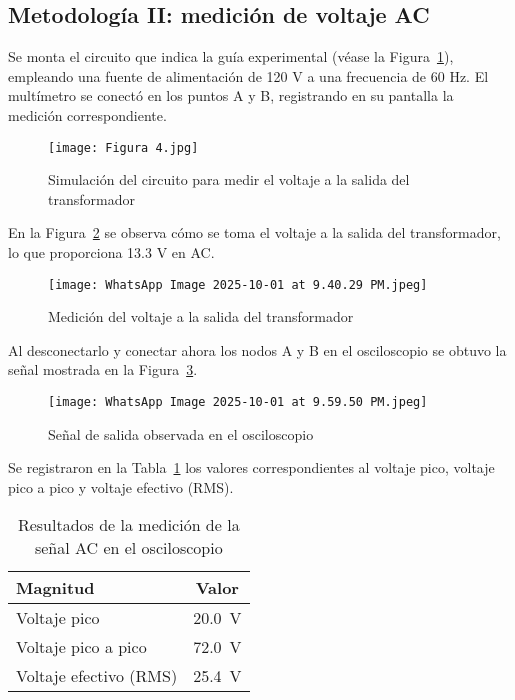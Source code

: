 \documentclass[conference]{IEEEtran} %
\begin{document}
\subsection{Metodología II: medición de voltaje AC}
Se monta el circuito que indica la guía experimental (véase la Figura~\ref{fig:simulacion-transformador}), empleando una fuente de alimentación de 120 V a una frecuencia de 60 Hz. El multímetro se conectó en los puntos A y B, registrando en su pantalla la medición correspondiente.
\begin{figure}[htbp]
    \centering
    \texttt{[image: Figura 4.jpg]}
    \caption{Simulación del circuito para medir el voltaje a la salida del transformador}
    \label{fig:simulacion-transformador}
\end{figure}
En la Figura~\ref{fig:medicion-transformador} se observa cómo se toma el voltaje a la salida del transformador, lo que proporciona 13.3 V en AC.
\begin{figure}[htbp]
    \centering
    \texttt{[image: WhatsApp Image 2025-10-01 at 9.40.29 PM.jpeg]}
    \caption{Medición del voltaje a la salida del transformador}
    \label{fig:medicion-transformador}
\end{figure}
Al desconectarlo y conectar ahora los nodos A y B en el osciloscopio se obtuvo la señal mostrada en la Figura~\ref{fig:senal-ac-osciloscopio}.
\begin{figure}[htbp]
    \centering
    \texttt{[image: WhatsApp Image 2025-10-01 at 9.59.50 PM.jpeg]}
    \caption{Señal de salida observada en el osciloscopio}
    \label{fig:senal-ac-osciloscopio}
\end{figure}
Se registraron en la Tabla~\ref{tab:resultados-ac} los valores correspondientes al voltaje pico, voltaje pico a pico y voltaje efectivo (RMS).
\begin{table}[htbp]
    \centering
    \caption{Resultados de la medición de la señal AC en el osciloscopio}
    \label{tab:resultados-ac}
    \begin{tabular}{@{}lc@{}}
        \toprule
        Magnitud & Valor \\ \midrule
        Voltaje pico & \SI{20.0}{\volt} \\
        Voltaje pico a pico & \SI{72.0}{\volt} \\
        Voltaje efectivo (RMS) & \SI{25.4}{\volt} \\
        \bottomrule
    \end{tabular}
\end{table}
\end{document}
